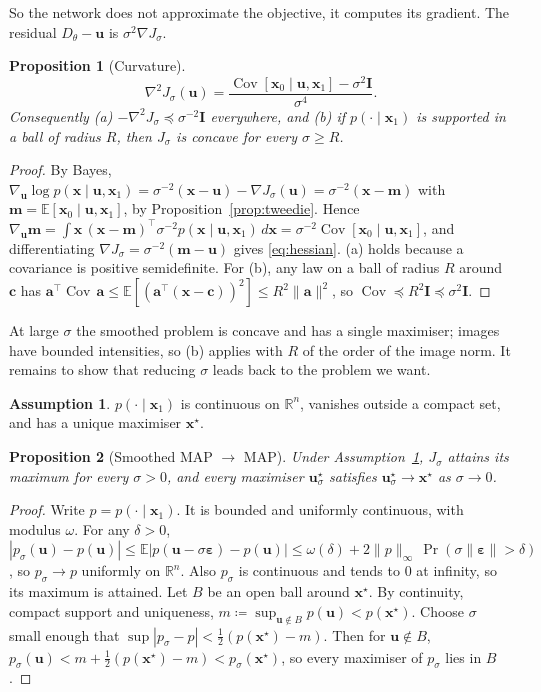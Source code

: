 \documentclass[11pt]{article}
\newtheorem{proposition}{Proposition}
\theoremstyle{definition}
\newtheorem{assumption}{Assumption}
\theoremstyle{remark}
\newcommand{\x}{\bm{x}}
\newcommand{\uu}{\bm{u}}
\newcommand{\eps}{\bm{\varepsilon}}
\newcommand{\E}{\mathbb{E}}
\newcommand{\R}{\mathbb{R}}
\newcommand{\Id}{\bm{I}}
\newcommand{\D}{D_\theta}
\newcommand{\grad}{\nabla}
\newcommand{\Cov}{\operatorname{Cov}}
\begin{document}
So the network does not approximate the objective, it computes its gradient. The residual
$\D - \uu$ is $\sigma^2\grad J_\sigma$.

\begin{proposition}[Curvature]\label{prop:curvature}
\begin{equation}
  \grad^2 J_\sigma(\uu) = \frac{\Cov[\x_0\mid\uu,\x_1] - \sigma^2\Id}{\sigma^4}.
  \label{eq:hessian}
\end{equation}
Consequently \emph{(a)} $-\grad^2 J_\sigma \preceq \sigma^{-2}\Id$ everywhere, and \emph{(b)}
if $p(\cdot\mid\x_1)$ is supported in a ball of radius $R$, then $J_\sigma$ is concave for every
$\sigma\ge R$.
\end{proposition}
\begin{proof}
By Bayes, $\grad_{\uu}\log p(\x\mid\uu,\x_1) = \sigma^{-2}(\x-\uu) - \grad J_\sigma(\uu)
= \sigma^{-2}(\x - \bm m)$ with $\bm m = \E[\x_0\mid\uu,\x_1]$, by
Proposition~\ref{prop:tweedie}. Hence
$\grad_{\uu}\bm m = \int\x\,(\x-\bm m)^\top\sigma^{-2}p(\x\mid\uu,\x_1)\,d\x =
\sigma^{-2}\Cov[\x_0\mid\uu,\x_1]$, and differentiating
$\grad J_\sigma = \sigma^{-2}(\bm m - \uu)$ gives \eqref{eq:hessian}. (a) holds because a
covariance is positive semidefinite. For (b), any law on a ball of radius $R$ around $\bm c$
has $\bm a^\top\Cov\,\bm a \le \E[(\bm a^\top(\x-\bm c))^2] \le R^2\|\bm a\|^2$, so
$\Cov\preceq R^2\Id\preceq\sigma^2\Id$.
\end{proof}

At large $\sigma$ the smoothed problem is concave and has a single maximiser; images have
bounded intensities, so (b) applies with $R$ of the order of the image norm. It remains to
show that reducing $\sigma$ leads back to the problem we want.

\begin{assumption}\label{ass:prior}
$p(\cdot\mid\x_1)$ is continuous on $\R^n$, vanishes outside a compact set, and has a unique
maximiser $\x^\star$.
\end{assumption}

\begin{proposition}[Smoothed MAP $\to$ MAP]\label{prop:consistency}
Under Assumption~\ref{ass:prior}, $J_\sigma$ attains its maximum for every $\sigma>0$, and
every maximiser $\uu^\star_\sigma$ satisfies $\uu^\star_\sigma\to\x^\star$ as $\sigma\to0$.
\end{proposition}
\begin{proof}
Write $p = p(\cdot\mid\x_1)$. It is bounded and uniformly continuous, with modulus $\omega$.
For any $\delta>0$,
$|p_\sigma(\uu) - p(\uu)| \le \E|p(\uu - \sigma\eps) - p(\uu)| \le
\omega(\delta) + 2\|p\|_\infty\,\Pr(\sigma\|\eps\|>\delta)$, so $p_\sigma\to p$ uniformly on
$\R^n$. Also $p_\sigma$ is continuous and tends to $0$ at infinity, so its maximum is attained.
Let $B$ be an open ball around $\x^\star$. By continuity, compact support and uniqueness,
$m \coloneqq \sup_{\uu\notin B} p(\uu) < p(\x^\star)$. Choose $\sigma$ small enough that
$\sup|p_\sigma - p| < \tfrac12(p(\x^\star) - m)$. Then for $\uu\notin B$,
$p_\sigma(\uu) < m + \tfrac12(p(\x^\star)-m) < p_\sigma(\x^\star)$, so every maximiser of
$p_\sigma$ lies in $B$.
\end{proof}
\end{document}
